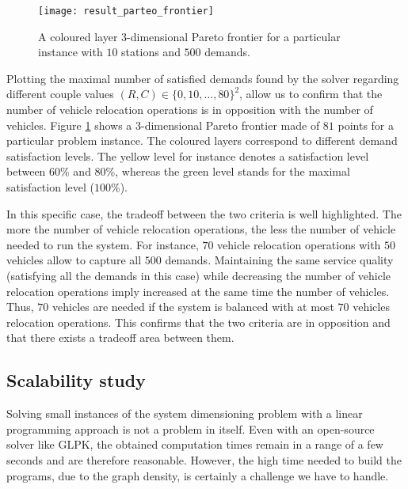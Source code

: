 
\begin{figure}[t]
\centering
\texttt{[image: result\_parteo\_frontier]}
\caption{A coloured layer 3-dimensional Pareto frontier for a particular instance with $10$ stations and $500$ demands.}
\label{fig_pareto}
\end{figure}

\bigskip
Plotting the maximal number of satisfied demands found by the solver regarding different couple values ${(R, C) \in \{0, 10, \dots, 80\}^2}$, allow us to confirm that the number of vehicle relocation operations is in opposition with the number of vehicles.
Figure \ref{fig_pareto} shows a 3-dimensional Pareto frontier made of $81$ points for a particular problem instance.
The coloured layers correspond to different demand satisfaction levels.
The yellow level for instance denotes a satisfaction level between $60$\% and $80$\%, whereas the green level stands for the maximal satisfaction level ($100$\%).

\bigskip
In this specific case, the tradeoff between the two criteria is well highlighted.
The more the number of vehicle relocation operations, the less the number of vehicle needed to run the system.
For instance, $70$ vehicle relocation operations with $50$ vehicles allow to capture all $500$ demands.
Maintaining the same service quality (satisfying all the demands in this case) while decreasing the number of vehicle relocation operations imply increased at the same time the number of vehicles.
Thus, $70$ vehicles are needed if the system is balanced with at most $70$ vehicles relocation operations.
This confirms that the two criteria are in opposition and that there exists a tradeoff area between them.

\subsection{Scalability study}
Solving small instances of the system dimensioning problem with a linear programming approach is not a problem in itself.
Even with an open-source solver like GLPK, the obtained computation times remain in a range of a few seconds and are therefore reasonable.
However, the high time needed to build the programs, due to the graph density, is certainly a challenge we have to handle.

